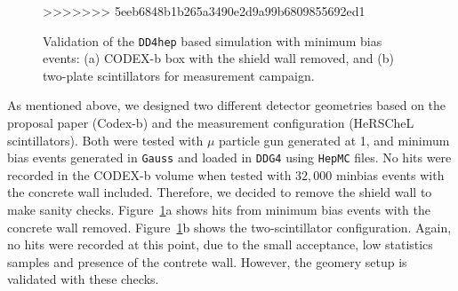 \begin{figure}
{}
\caption{\label{fig:dd4hep_events}
    Validation of the {\tt DD4hep} based simulation with minimum bias events: (a) CODEX-b box with the shield wall removed, and (b) two-plate scintillators for measurement campaign.}
>>>>>>> 5eeb6848b1b265a3490e2d9a99b6809855692ed1
\end{figure}

As mentioned above, we designed two different detector geometries based on the proposal paper (Codex-b) and the measurement configuration (HeRSCheL scintillators). Both were tested with $\mu$ particle gun generated at 1\tev, and minimum bias events generated in {\tt Gauss} and loaded in {\tt DDG4} using {\tt HepMC} files. 
No hits were recorded in the CODEX-b volume when tested with $32,000$ minbias events with the concrete wall included. Therefore, we decided to remove the shield wall to make sanity checks. Figure~\ref{fig:dd4hep_events}a shows hits from minimum bias events with the concrete wall removed. Figure~\ref{fig:dd4hep_events}b shows the two-scintillator configuration. Again, no hits were recorded at this point, due to the small acceptance, low statistics samples and presence of the contrete wall. However, the geomery setup is validated with these checks.

